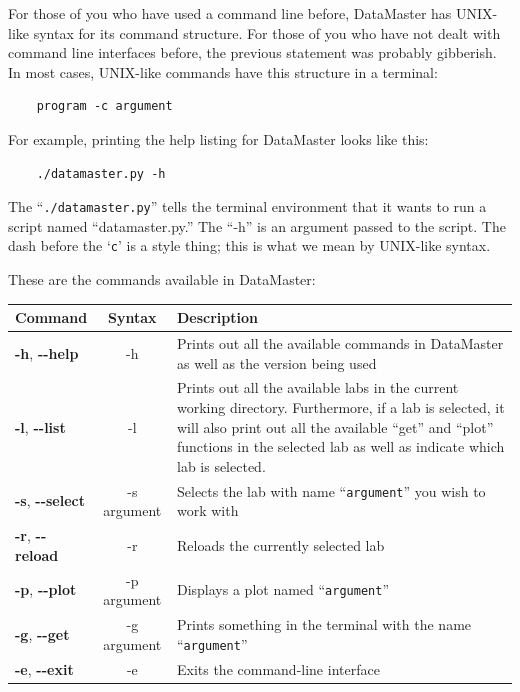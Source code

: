 \documentclass[12pt]{article}
\begin{document}
{For those of you who have used a command line before, DataMaster has UNIX-like syntax for its command structure. For those of you who have not dealt with command line interfaces before, the previous statement was probably gibberish. In most cases, UNIX-like commands have this structure in a terminal:
\begin{framed}
  \begin{lstlisting}
    program -c argument
  \end{lstlisting}
\end{framed}
For example, printing the help listing for DataMaster looks like this:
\begin{framed}
  \begin{lstlisting}
    ./datamaster.py -h
  \end{lstlisting}
\end{framed}
The ``\texttt{./datamaster.py}'' tells the terminal environment that it wants to run a script named ``datamaster.py.'' The ``-h'' is an argument passed to the script. The dash before the `\texttt{c}' is a style thing; this is what we mean by UNIX-like syntax.

These are the commands available in DataMaster:
\begin{framed}
  \centering
  {
  \setlength{\tabcolsep}{14pt}
  \renewcommand{\arraystretch}{2.5}
    \begin{tabular}{l | c | m{}}
      Command & Syntax & Description\\\hline
      \textbf{-h}, \textbf{{-}-help} & -h & Prints out all the available commands in DataMaster as well as the version being used \\
      \textbf{-l}, \textbf{{-}-list} & -l & Prints out all the available labs in the current working directory. Furthermore, if a lab is selected, it will also print out all the available ``get'' and ``plot'' functions in the selected lab as well as indicate which lab is selected.\\
      \textbf{-s}, \textbf{{-}-select} & -s argument & Selects the lab with name ``\texttt{argument}'' you wish to work with \\
      \textbf{-r}, \textbf{{-}-reload} & -r & Reloads the currently selected lab \\
      \textbf{-p}, \textbf{{-}-plot} & -p argument & Displays a plot named ``\texttt{argument}''\\
      \textbf{-g}, \textbf{{-}-get} & -g argument & Prints something in the terminal with the name ``\texttt{argument}'' \\
      \textbf{-e}, \textbf{{-}-exit} & -e & Exits the command-line interface \\
    \end{tabular}
  }
\end{framed}

}
\end{document}
